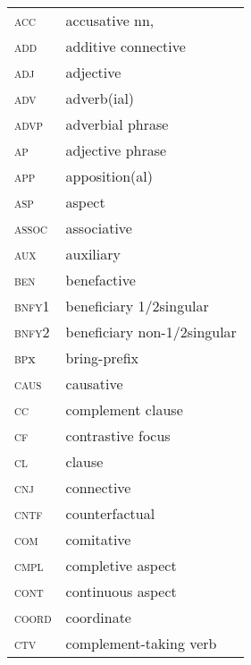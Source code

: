 \begin{tabular}{ll}
\textsc{acc}                            & accusative nn, \\
\textsc{add}                            & additive connective \\
\textsc{adj}                            & adjective \\
\textsc{adv}                            & adverb(ial) \\
\textsc{advp}                            & adverbial phrase \\
\textsc{ap}                            & adjective phrase \\
\textsc{app}                            & apposition(al) \\
\textsc{asp}                            & aspect \\
\textsc{assoc}                            & associative \\
\textsc{aux}                            & auxiliary \\
\textsc{ben}                            & benefactive \\
\textsc{bnfy1}                            & beneficiary 1/2singular \\
\textsc{bnfy2}                            & beneficiary non-1/2singular \\
\textsc{bp}x                            & bring-prefix \\
\textsc{caus}                            & causative \\
\textsc{cc}                            & complement clause \\
\textsc{cf}                            & contrastive focus \\
\textsc{cl}                            & clause \\
\textsc{cnj}                            & connective \\
\textsc{cntf}                            & counterfactual \\
\textsc{com}                            & comitative \\
\textsc{cmpl}                            & completive aspect \\
\textsc{cont}                            & continuous aspect \\
\textsc{coord}                            & coordinate \\
\textsc{ctv}                            & complement-taking verb \\
\end{tabular}


